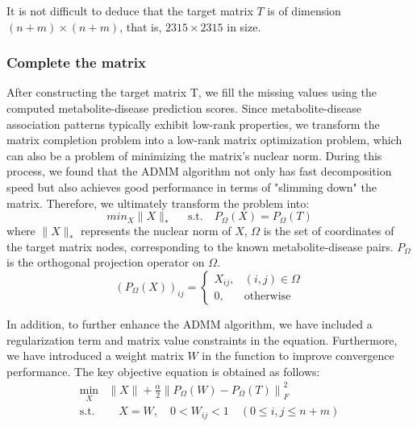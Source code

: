 \documentclass[a4paper,fleqn]{cas-dc}
\begin{document}
It is not difficult to deduce that the target matrix \( T \) is of dimension \( (n+m) \times (n+m) \), that is, \( 2315 \times 2315 \) in size.

\subsubsection{Complete the matrix}
After constructing the target matrix T, we fill the missing values using the computed metabolite-disease prediction scores. Since metabolite-disease association patterns typically exhibit low-rank properties, we transform the matrix completion problem into a low-rank matrix optimization problem\cite{ramlatchan2018survey}, which can also be a problem of minimizing the matrix's nuclear norm\cite{candes2013simple}. During this process, we found that the ADMM algorithm\cite{MAL-016} not only has fast decomposition speed but also achieves good performance in terms of "slimming down" the matrix. Therefore, we ultimately transform the problem into:
\begin{equation}
	min_X \|X\|_*  \;\;\;\;\;   \text{s.t.}\!\!\!\!\quad P_\Omega(X) = P_\Omega(T)
\end{equation}
where \(\|X\|_*\) represents the nuclear norm of \( X \), \( \Omega \) is the set of coordinates of the target matrix nodes, corresponding to the known metabolite-disease pairs.  \( P_\Omega \) is the orthogonal projection operator on \( \Omega \).
\begin{equation}
	\left(P_{\Omega}(X)\right)_{ij} = \begin{cases} 
		X_{ij}, & (i, j) \in \Omega \\
		0, & \text{otherwise}
	\end{cases}
\end{equation}

In addition, to further enhance the ADMM algorithm, we have included a regularization term and matrix value constraints in the equation. Furthermore, we have introduced a weight matrix \( W \) in the function to improve convergence performance. The key objective equation is obtained as follows:
\begin{equation}
	\begin{split}
		\min_X & \|X\| + \frac{\alpha}{2} \left\| P_{\Omega}(W) - P_{\Omega}(T) \right\|_F^2 \\
		\text{s.t.} & \quad X = W, \quad 0 < W_{ij} < 1 \quad (0 \leq i, j \leq n+m)
	\end{split}
\end{equation}
\end{document}

